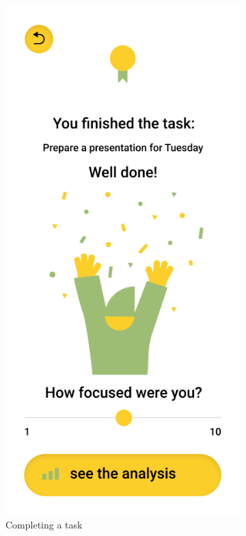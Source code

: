 \begin{figure}[htb!]
\begin{center}
\begin{subfigure}{.3\textwidth}
        \end{subfigure}%
        \begin{subfigure}{.3\textwidth}
            \centering
            \includegraphics[width=0.8\linewidth]{images/sage_finish.png}
            \caption{Completing a task}
            \label{fig:gmaps_gamify_home}
        \end{subfigure}%
        \begin{subfigure}{.3\textwidth}
            \centering

\end{subfigure}
\end{center}
\end{figure}
